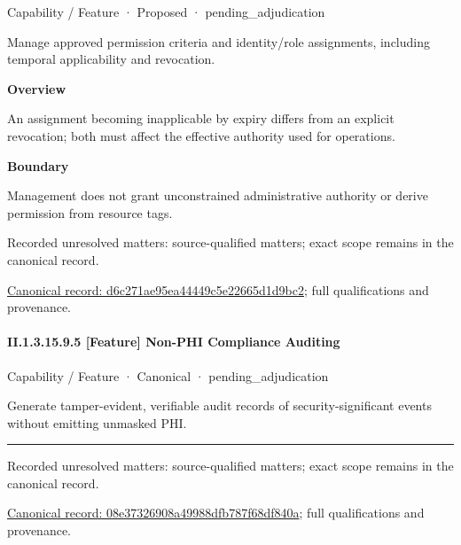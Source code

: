 \label{element:d6c271ae95ea44449c5e22665d1d9bc2}
{\small Capability / Feature · Proposed · pending\_adjudication}\par

Manage approved permission criteria and identity/role assignments, including temporal applicability and revocation.



\textbf{Overview}



An assignment becoming inapplicable by expiry differs from an explicit revocation; both must affect the effective authority used for operations.



\textbf{Boundary}



Management does not grant unconstrained administrative authority or derive permission from resource tags.


{\small Recorded unresolved matters: source-qualified matters; exact scope remains in the canonical record.}\par
{\footnotesize \href{../../../../continuum/strategy/capability/feature/d6c271ae95ea44449c5e22665d1d9bc2.md}{Canonical record: d6c271ae95ea44449c5e22665d1d9bc2}; full qualifications and provenance.}\par
\paragraph*{II.1.3.15.9.5 [Feature] Non-PHI Compliance Auditing}
\label{navigation:II.1.3.15.9.5}

\label{element:08e37326908a49988dfb787f68df840a}
{\small Capability / Feature · Canonical · pending\_adjudication}\par

Generate tamper-evident, verifiable audit records of security-significant events without emitting unmasked PHI.



\medskip\hrule\medskip

{\small Recorded unresolved matters: source-qualified matters; exact scope remains in the canonical record.}\par
{\footnotesize \href{../../../../continuum/strategy/capability/feature/08e37326908a49988dfb787f68df840a.md}{Canonical record: 08e37326908a49988dfb787f68df840a}; full qualifications and provenance.}\par
